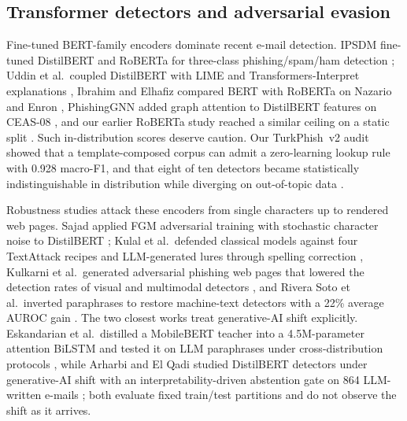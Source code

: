 \subsection{Transformer detectors and adversarial evasion}
Fine-tuned BERT-family encoders dominate recent e-mail detection. IPSDM fine-tuned DistilBERT and RoBERTa for three-class phishing/spam/ham detection \cite{jamal2024}; Uddin et al.\ coupled DistilBERT with LIME and Transformers-Interpret explanations \cite{uddin2026}, Ibrahim and Elhafiz compared BERT with RoBERTa on Nazario and Enron \cite{ibrahim2026}, PhishingGNN added graph attention to DistilBERT features on CEAS-08 \cite{safran2025}, and our earlier RoBERTa study reached a similar ceiling on a static split \cite{cetlenbik2024roberta}. Such in-distribution scores deserve caution. Our TurkPhish~v2 audit showed that a template-composed corpus can admit a zero-learning lookup rule with 0.928 macro-F1, and that eight of ten detectors became statistically indistinguishable in distribution while diverging on out-of-topic data \cite{cetlenbik2026}.

Robustness studies attack these encoders from single characters up to rendered web pages. Sajad applied FGM adversarial training with stochastic character noise to DistilBERT \cite{sajad2025}; Kulal et al.\ defended classical models against four TextAttack recipes and LLM-generated lures through spelling correction \cite{kulal2025}, Kulkarni et al.\ generated adversarial phishing web pages that lowered the detection rates of visual and multimodal detectors \cite{kulkarni2025}, and Rivera Soto et al.\ inverted paraphrases to restore machine-text detectors with a 22\% average AUROC gain \cite{riverasoto2025}. The two closest works treat generative-AI shift explicitly. Eskandarian et al.\ distilled a MobileBERT teacher into a 4.5M-parameter attention BiLSTM and tested it on LLM paraphrases under cross-distribution protocols \cite{eskandarian2026}, while Arharbi and El Qadi studied DistilBERT detectors under generative-AI shift with an interpretability-driven abstention gate on 864 LLM-written e-mails \cite{arharbi2026}; both evaluate fixed train/test partitions and do not observe the shift as it arrives.

